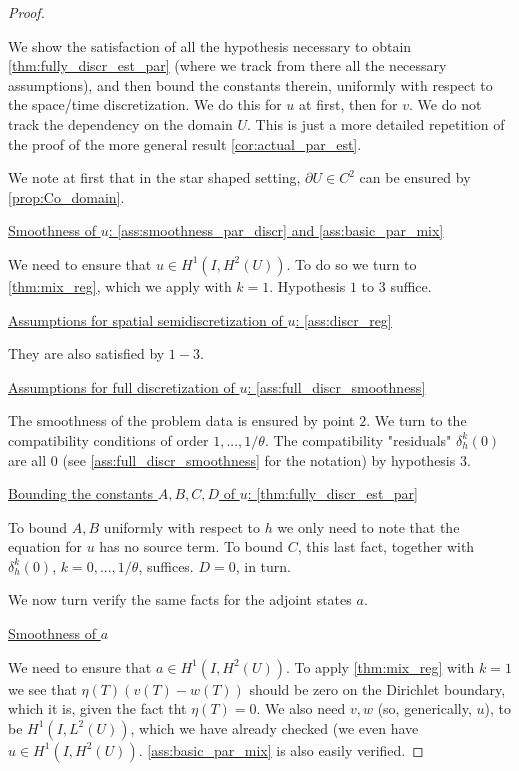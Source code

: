 \documentclass[english,a4paper,10pt,oneside]{scrbook}	%
\theoremstyle{break}
\newenvironment{mproof}[1][\proofname]{%
  \begin{proof}[#1]$ $\par\nobreak\ignorespaces
}{%
  \end{proof}
}
\renewcommand*{\proofname}{Proof}
\theoremstyle{remark}
\begin{document}
\begin{mproof}

We show the satisfaction of all the hypothesis necessary to obtain \cref{thm:fully_discr_est_par} (where we track from there all the necessary assumptions), and then bound the constants therein, uniformly with respect to the space/time discretization. We do this for $u$ at first, then for $v$. We do not track the dependency on the domain $U$. This is just a more detailed repetition of the proof of the more general result \cref{cor:actual_par_est}.

We note at first that in the star shaped setting, $\partial U \in C^2$ can be ensured by \cref{prop:Co_domain}.

\underline{Smoothness of $u$: \cref{ass:smoothness_par_discr} and  \cref{ass:basic_par_mix}}

We need to ensure that $u \in H^1(I,H^2(U))$. To do so we turn to \cref{thm:mix_reg}, which we apply with $k=1$. Hypothesis $1$ to $3$ suffice. 

\underline{Assumptions for spatial semidiscretization of $u$: \cref{ass:discr_reg}}

They are also satisfied by $1-3$.

\underline{Assumptions for full discretization of $u$: \cref{ass:full_discr_smoothness}}

The smoothness of the problem data is ensured by point $2$. We turn to the compatibility conditions of order $1,...,1/\theta$. The compatibility "residuals" $\delta_h^k(0)$ are all $0$ (see \cref{ass:full_discr_smoothness} for the notation) by hypothesis $3$.

\underline{Bounding the constants $A,B,C,D$ of $u$: \cref{thm:fully_discr_est_par}}

To bound $A,B$ uniformly with respect to $h$ we only need to note that the equation for $u$ has no source term. To bound $C$, this last fact, together with $\delta_h^k(0)$, $k=0,...,1/\theta$, suffices. $D=0$, in turn.

We now turn verify the same facts for the adjoint states $a$.

\underline{Smoothness of $a$}

We need to ensure that $a \in H^1(I,H^2(U))$. To apply \cref{thm:mix_reg} with $k=1$ we see that $\eta(T)(v(T)-w(T))$ should be zero on the Dirichlet boundary, which it is, given the fact tht $\eta(T)=0$. We also need $v,w$ (so, generically, $u$), to be $H^1(I, L^2(U))$, which we have already checked (we even have $u \in H^1(I,H^2(U))$.  \cref{ass:basic_par_mix} is also easily verified.


\end{mproof}
\end{document}
